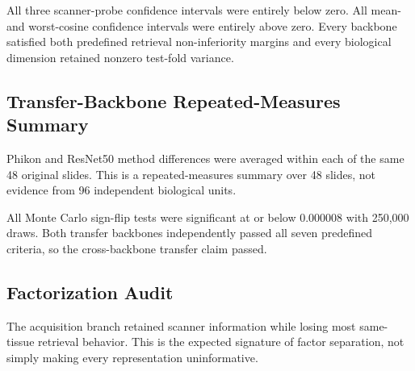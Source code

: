 \documentclass[10pt]{article}
\begin{document}
All three scanner-probe confidence intervals were entirely below zero. All mean- and worst-cosine confidence intervals were entirely above zero. Every backbone satisfied both predefined retrieval non-inferiority margins and every biological dimension retained nonzero test-fold variance.

\subsection{Transfer-Backbone Repeated-Measures Summary}
Phikon and ResNet50 method differences were averaged within each of the same 48 original slides. This is a repeated-measures summary over 48 slides, not evidence from 96 independent biological units.

\begin{center}
\centering
{}
\scriptsize
{}
\label{tab:transfer}
\end{center}

All Monte Carlo sign-flip tests were significant at or below 0.000008 with 250,000 draws. Both transfer backbones independently passed all seven predefined criteria, so the cross-backbone transfer claim passed.

\subsection{Factorization Audit}
The acquisition branch retained scanner information while losing most same-tissue retrieval behavior. This is the expected signature of factor separation, not simply making every representation uninformative.
\end{document}
